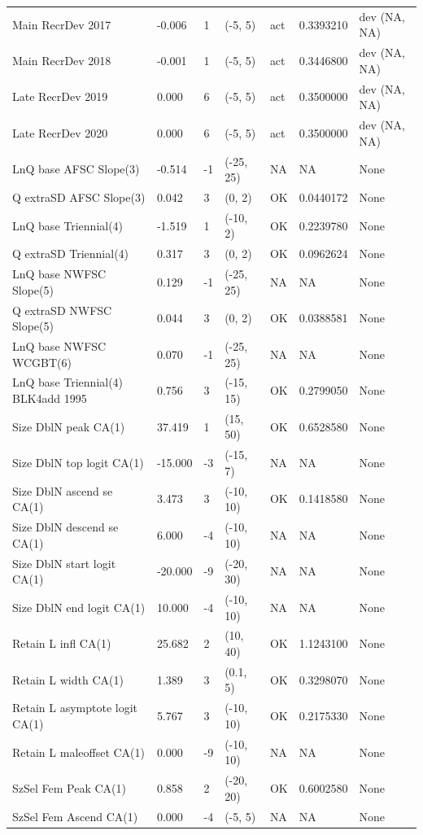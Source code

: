 \documentclass[11pt,
  english,
  a4paper,
]{article}
\begin{document}
\begin{landscape}
\begin{longtable}[t]{>{\raggedright\arraybackslash}p{7cm}lllll>{\raggedright\arraybackslash}p{4cm}}
Main RecrDev 2017 & -0.006 & 1 & (-5, 5) & act & 0.3393210 & dev (NA, NA)\\
Main RecrDev 2018 & -0.001 & 1 & (-5, 5) & act & 0.3446800 & dev (NA, NA)\\
Late RecrDev 2019 & 0.000 & 6 & (-5, 5) & act & 0.3500000 & dev (NA, NA)\\
Late RecrDev 2020 & 0.000 & 6 & (-5, 5) & act & 0.3500000 & dev (NA, NA)\\
LnQ base AFSC Slope(3) & -0.514 & -1 & (-25, 25) & NA & NA & None\\
Q extraSD AFSC Slope(3) & 0.042 & 3 & (0, 2) & OK & 0.0440172 & None\\
LnQ base Triennial(4) & -1.519 & 1 & (-10, 2) & OK & 0.2239780 & None\\
Q extraSD Triennial(4) & 0.317 & 3 & (0, 2) & OK & 0.0962624 & None\\
LnQ base NWFSC Slope(5) & 0.129 & -1 & (-25, 25) & NA & NA & None\\
Q extraSD NWFSC Slope(5) & 0.044 & 3 & (0, 2) & OK & 0.0388581 & None\\
LnQ base NWFSC WCGBT(6) & 0.070 & -1 & (-25, 25) & NA & NA & None\\
LnQ base Triennial(4) BLK4add 1995 & 0.756 & 3 & (-15, 15) & OK & 0.2799050 & None\\
Size DblN peak CA(1) & 37.419 & 1 & (15, 50) & OK & 0.6528580 & None\\
Size DblN top logit CA(1) & -15.000 & -3 & (-15, 7) & NA & NA & None\\
Size DblN ascend se CA(1) & 3.473 & 3 & (-10, 10) & OK & 0.1418580 & None\\
Size DblN descend se CA(1) & 6.000 & -4 & (-10, 10) & NA & NA & None\\
Size DblN start logit CA(1) & -20.000 & -9 & (-20, 30) & NA & NA & None\\
Size DblN end logit CA(1) & 10.000 & -4 & (-10, 10) & NA & NA & None\\
Retain L infl CA(1) & 25.682 & 2 & (10, 40) & OK & 1.1243100 & None\\
Retain L width CA(1) & 1.389 & 3 & (0.1, 5) & OK & 0.3298070 & None\\
Retain L asymptote logit CA(1) & 5.767 & 3 & (-10, 10) & OK & 0.2175330 & None\\
Retain L maleoffset CA(1) & 0.000 & -9 & (-10, 10) & NA & NA & None\\
SzSel Fem Peak CA(1) & 0.858 & 2 & (-20, 20) & OK & 0.6002580 & None\\
SzSel Fem Ascend CA(1) & 0.000 & -4 & (-5, 5) & NA & NA & None\\

\end{longtable}
\end{landscape}
\end{document}
